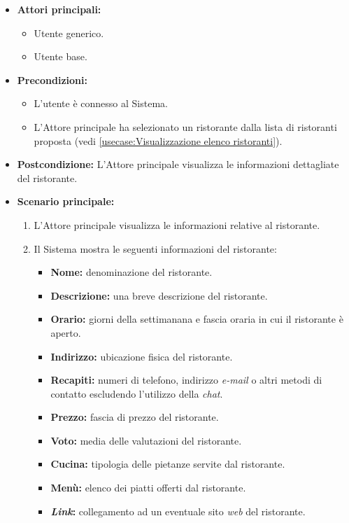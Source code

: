 \begin{itemize}

	\item \textbf{Attori principali:} 
	\begin{itemize}
		\item Utente generico.
		\item Utente base.
	\end{itemize}

	\item \textbf{Precondizioni:}
	\begin{itemize}
        \item L'utente è connesso al Sistema.
        \item L'Attore principale ha selezionato un ristorante dalla lista di ristoranti proposta (vedi \autoref{usecase:Visualizzazione elenco ristoranti}).
    \end{itemize}

	\item \textbf{Postcondizione:} L'Attore principale visualizza le informazioni dettagliate del ristorante.

	\item \textbf{Scenario principale:}
		\begin{enumerate}
		    \item L'Attore principale visualizza le informazioni relative al ristorante.
		    \item Il Sistema mostra le seguenti informazioni del ristorante:
		    \begin{itemize}
				\item \textbf{Nome:} denominazione del ristorante.
				\item \textbf{Descrizione:} una breve descrizione del ristorante.
				\item \textbf{Orario:} giorni della settimanana e fascia oraria in cui il ristorante è aperto.
				\item \textbf{Indirizzo:} ubicazione fisica del ristorante.
				\item \textbf{Recapiti:} numeri di telefono, indirizzo \textit{e-mail} o altri metodi di contatto escludendo l'utilizzo della \textit{chat}.
				\item \textbf{Prezzo:} fascia di prezzo del ristorante.
				\item \textbf{Voto:} media delle valutazioni del ristorante.
				\item \textbf{Cucina:} tipologia delle pietanze servite dal ristorante.
				\item \textbf{Menù:} elenco dei piatti offerti dal ristorante.
				\item \textbf{\textit{Link}:} collegamento ad un eventuale sito \textit{web} del ristorante. 
			\end{itemize}
	    \end{enumerate}

\end{itemize}
